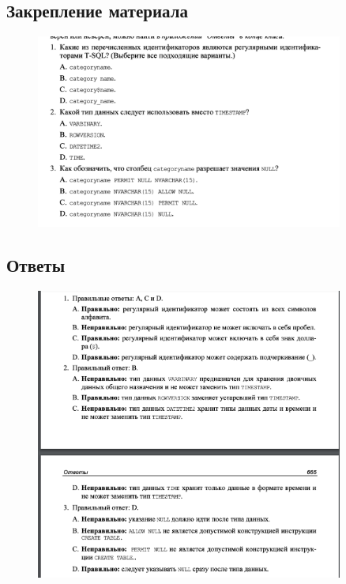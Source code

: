 \subsection*{Закрепление материала}

\begin{figure}[h!]
	\begin{center}
		\includegraphics[width=0.9\textwidth]{img/zakrep15.png}
	\end{center}
	\captionsetup{justification=centering}
\end{figure}
\newpage

\subsection*{Ответы}

\begin{figure}[h!]
	\begin{center}
		\includegraphics[width=0.9\textwidth]{img/ans16.png}
	\end{center}
	\captionsetup{justification=centering}
\end{figure}
\clearpage


